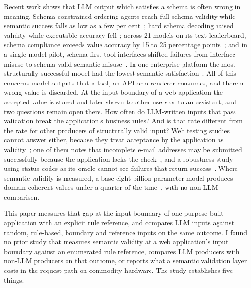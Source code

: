 \documentclass[conference]{IEEEtran}
\begin{document}
Recent work shows that LLM output which satisfies a schema is often wrong in meaning. Schema-constrained
ordering agents reach full schema validity while semantic success falls as low as a few per
cent~\cite{li2026orderbench}; hard schema decoding raised validity while executable accuracy
fell~\cite{ray2026constrainttax}; across 21 models on its text leaderboard, schema compliance exceeds value
accuracy by 15 to 25 percentage points~\cite{singh2026sob}; and in a single-model pilot, schema-first tool interfaces shifted failures from
interface misuse to schema-valid semantic misuse~\cite{sigdel2026schemafirst}. In one enterprise
platform the most structurally successful model had the lowest semantic
satisfaction~\cite{wrenn2026enterprise}. All of this concerns model
outputs that a tool, an API or a renderer consumes, and there a wrong value is discarded. At the input
boundary of a web application the accepted value is stored and later shown to other users or to an
assistant, and two questions remain open there. How often do LLM-written inputs that pass validation
break the application's business rules? And is that rate different from the rate for other producers of
structurally valid input? Web testing studies cannot answer either, because they treat acceptance by the
application as validity~\cite{li2026webformtest,alian2024formnexus}; one of them notes that incomplete
e-mail addresses may be submitted successfully because the application lacks the
check~\cite{li2026webformtest}, and a robustness study using status codes as its oracle cannot see
failures that return success~\cite{tigulla2026robustness}. Where semantic validity is measured, a base
eight-billion-parameter model produces domain-coherent values under a quarter of the
time~\cite{kim2025llamaresttest}, with no non-LLM comparison.

This paper measures that gap at the input boundary of one purpose-built application with an explicit
rule reference, and compares LLM inputs against random, rule-based, boundary and reference inputs on
the same outcome. I found no prior study that measures semantic validity at a web application's input
boundary against an enumerated rule reference, compares LLM producers with non-LLM producers on that
outcome, or reports what a semantic validation layer costs in the request path on commodity hardware.
The study establishes five things.
\end{document}
